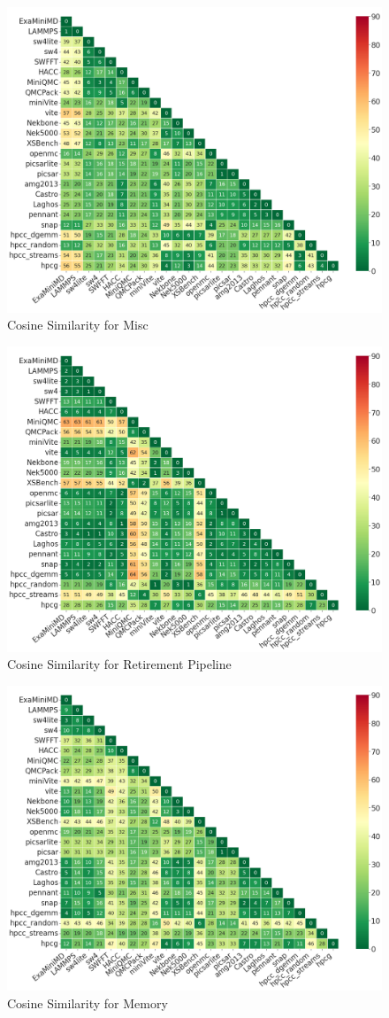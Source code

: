 \documentclass[conference]{IEEEtran}
\begin{document}
\begin{figure}[ht]
\centering
\includegraphics[width=0.9\linewidth]{figs/Misc.png}
\caption{Cosine Similarity for Misc }
\label{figs:cosine Misc}
\end{figure}



\begin{figure}[ht]
\centering
\includegraphics[width=0.9\linewidth]{figs/Retirement_Pipeline.png}
\caption{Cosine Similarity for Retirement Pipeline }
\label{figs:cosine Retirement_Pipeline}
\end{figure}

\begin{figure}[ht]
\centering
\includegraphics[width=0.9\linewidth]{figs/Memory.png}
\caption{Cosine Similarity for Memory }
\label{figs:cosine Memory}
\end{figure}
\end{document}
